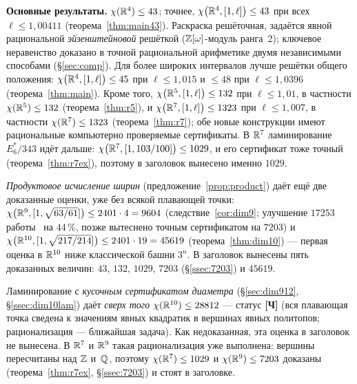 \begin{keybox}
\textbf{Основные результаты.} $\chi(\mathbb{R}^4)\le 43$; точнее,
$\chi\bigl(\mathbb{R}^4,[1,\ell]\bigr)\le43$ при всех $\ell\le1{,}00411$
(теорема~\ref{thm:main43}). Раскраска решёточная, задаётся явной рациональной
\emph{эйзенштейновой} решёткой ($\mathbb{Z}[\omega]$-модуль ранга~2); ключевое
неравенство доказано в точной рациональной арифметике двумя независимыми
способами (\S\ref{sec:comp}). Для более широких интервалов лучше решётки
общего положения: $\chi\bigl(\mathbb{R}^4,[1,\ell]\bigr)\le45$ при $\ell\le1{,}015$ и
$\le48$ при $\ell\le1{,}0396$ (теорема~\ref{thm:main}). Кроме того,
$\chi\bigl(\mathbb{R}^5,[1,\ell]\bigr)\le132$ при $\ell\le1{,}01$, в частности
$\chi(\mathbb{R}^5)\le132$ (теорема~\ref{thm:r5}), и
$\chi\bigl(\mathbb{R}^7,[1,\ell]\bigr)\le1323$ при $\ell\le1{,}007$, в частности
$\chi(\mathbb{R}^7)\le1323$ (теорема~\ref{thm:r7}); обе новые конструкции имеют
рациональные компьютерно проверяемые сертификаты. В $\mathbb{R}^7$ ламинирование
$E_6^*/343$ идёт дальше: $\chi\bigl(\mathbb{R}^7,[1,103/100]\bigr)\le1029$, и его
сертификат тоже точный (теорема~\ref{thm:r7ex}), поэтому в заголовок вынесено
именно $1029$.

\emph{Продуктовое исчисление ширин} (предложение~\ref{prop:product}) даёт
ещё две доказанные оценки, уже без всякой плавающей точки:
$\chi\bigl(\mathbb{R}^9,[1,\sqrt{63/61}]\bigr)\le2401\cdot4=9604$
(следствие~\ref{cor:dim9}; улучшение $17253$ работы~\cite{ABPR} на $44\,\%$,
позже вытеснено точным сертификатом на $7203$) и
$\chi\bigl(\mathbb{R}^{10},[1,\sqrt{217/214}]\bigr)\le2401\cdot19=45619$
(теорема~\ref{thm:dim10}) --- первая оценка в $\mathbb{R}^{10}$ ниже классической
башни $3^n$. В заголовок вынесены пять доказанных величин: $43$, $132$,
$1029$, $7203$ (\S\ref{ssec:7203}) и $45619$.

Ламинирование с \emph{кусочным сертификатом диаметра} (\S\ref{sec:dim912},
\S\ref{ssec:dim10lam}) даёт \emph{сверх того} $\chi(\mathbb{R}^{10})\le28812$ ---
статус \textbf{[Ч]} (вся плавающая точка сведена к значениям явных квадратик в
вершинах явных политопов; рационализация --- ближайшая задача). Как
недоказанная, эта оценка в заголовок не вынесена. В $\mathbb{R}^7$ и $\mathbb{R}^9$ такая
рационализация уже выполнена: вершины пересчитаны над $\mathbb{Z}$ и~$\mathbb{Q}$, поэтому
$\chi(\mathbb{R}^7)\le1029$ и $\chi(\mathbb{R}^9)\le7203$ доказаны (теорема~\ref{thm:r7ex},
\S\ref{ssec:7203}) и стоят в заголовке.
\end{keybox}

